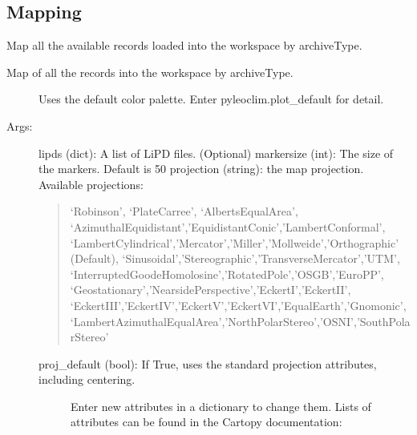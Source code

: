 \documentclass[letterpaper,10pt,english]{sphinxmanual}
\begin{document}
\subsection{Mapping}
\label{\detokenize{Main:mapping}}

\begin{fulllineitems}
\label{\detokenize{Main:pyleoclim.mapAllArchive}}
Map all the available records loaded into the workspace by archiveType.
\begin{description}
\item[{Map of all the records into the workspace by archiveType.}] \leavevmode
Uses the default color palette. Enter pyleoclim.plot\_default for detail.

\item[{Args:}] \leavevmode
lipds (dict): A list of LiPD files. (Optional)
markersize (int): The size of the markers. Default is 50
projection (string): the map projection. Available projections:
\begin{quote}

‘Robinson’, ‘PlateCarree’, ‘AlbertsEqualArea’,
‘AzimuthalEquidistant’,’EquidistantConic’,’LambertConformal’,
‘LambertCylindrical’,’Mercator’,’Miller’,’Mollweide’,’Orthographic’ (Default),
‘Sinusoidal’,’Stereographic’,’TransverseMercator’,’UTM’,
‘InterruptedGoodeHomolosine’,’RotatedPole’,’OSGB’,’EuroPP’,
‘Geostationary’,’NearsidePerspective’,’EckertI’,’EckertII’,
‘EckertIII’,’EckertIV’,’EckertV’,’EckertVI’,’EqualEarth’,’Gnomonic’,
‘LambertAzimuthalEqualArea’,’NorthPolarStereo’,’OSNI’,’SouthPolarStereo’
\end{quote}
\begin{description}
\item[{proj\_default (bool): If True, uses the standard projection attributes, including centering.}] \leavevmode
Enter new attributes in a dictionary to change them. Lists of attributes
can be found in the Cartopy documentation:
\begin{quote}

\end{quote}


\end{description}
\end{description}
\end{fulllineitems}
\end{document}
